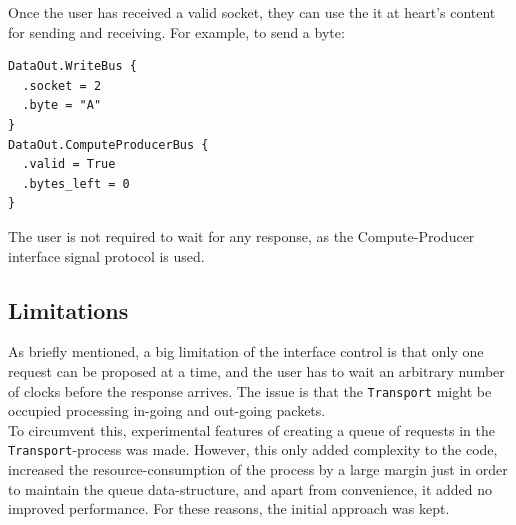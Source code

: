 Once the user has received a valid socket, they can use the it at heart's
content for sending and receiving. For example, to send a byte:
\begin{Verbatim}[frame=single,samepage=true]
DataOut.WriteBus {
  .socket = 2
  .byte = "A"
}
DataOut.ComputeProducerBus {
  .valid = True
  .bytes_left = 0
}
\end{Verbatim}
The user is not required to wait for any response, as the Compute-Producer
interface signal protocol is used.


\subsection{Limitations}
As briefly mentioned, a big limitation of the interface control is that only
one request can be proposed at a time, and the user has to wait an arbitrary
number of clocks before the response arrives. The issue is that the
\texttt{Transport} might be occupied processing in-going and out-going
packets.\\
To circumvent this, experimental features of creating a queue of requests in
the \texttt{Transport}-process was made. However, this only added complexity to
the code, increased the resource-consumption of the process by a large margin
just in order to maintain the queue data-structure, and apart from convenience,
it added no improved performance. For these reasons, the initial approach was
kept.












